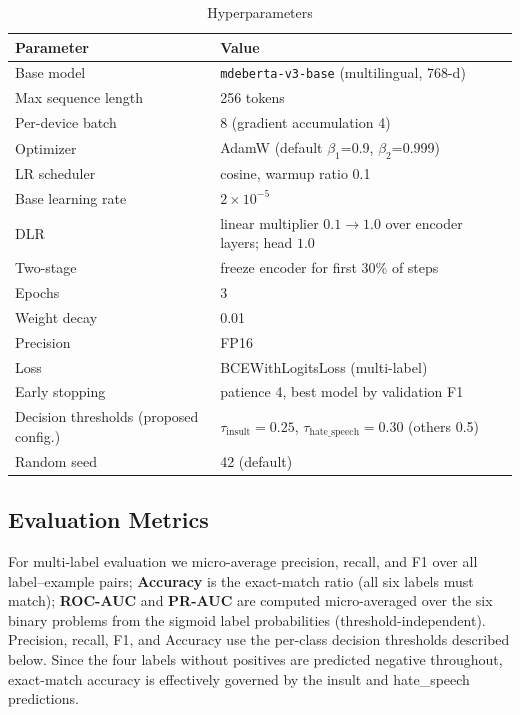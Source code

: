 \documentclass[runningheads]{llncs}
\begin{document}
\begin{table}
\centering\footnotesize
\caption{Hyperparameters}\label{tab:hyperparams}
\begin{tabular}{@{}ll@{}}
\hline
\textbf{Parameter} & \textbf{Value} \\
\hline
Base model & \texttt{mdeberta-v3-base} (multilingual, 768-d) \\
Max sequence length & 256 tokens \\
Per-device batch & 8 (gradient accumulation 4) \\
Optimizer & AdamW (default $\beta_1$=0.9, $\beta_2$=0.999) \\
LR scheduler & cosine, warmup ratio 0.1 \\
Base learning rate & $2\times10^{-5}$ \\
DLR & linear multiplier $0.1 \to 1.0$ over encoder layers; head $1.0$ \\
Two-stage & freeze encoder for first 30\% of steps \\
Epochs & 3 \\
Weight decay & 0.01 \\
Precision & FP16 \\
Loss & BCEWithLogitsLoss (multi-label) \\
Early stopping & patience 4, best model by validation F1 \\
Decision thresholds (proposed config.) & $\tau_{\mathrm{insult}}=0.25$, $\tau_{\mathrm{hate\_speech}}=0.30$ (others 0.5) \\
Random seed & 42 (default) \\
\hline
\end{tabular}
\end{table}

\subsection{Evaluation Metrics}

For multi-label evaluation we micro-average precision, recall, and F1 over all label--example pairs; \textbf{Accuracy} is the exact-match ratio (all six labels must match); \textbf{ROC-AUC} and \textbf{PR-AUC} are computed micro-averaged over the six binary problems from the sigmoid label probabilities (threshold-independent). Precision, recall, F1, and Accuracy use the per-class decision thresholds described below. Since the four labels without positives are predicted negative throughout, exact-match accuracy is effectively governed by the insult and hate\_speech predictions.
\end{document}
